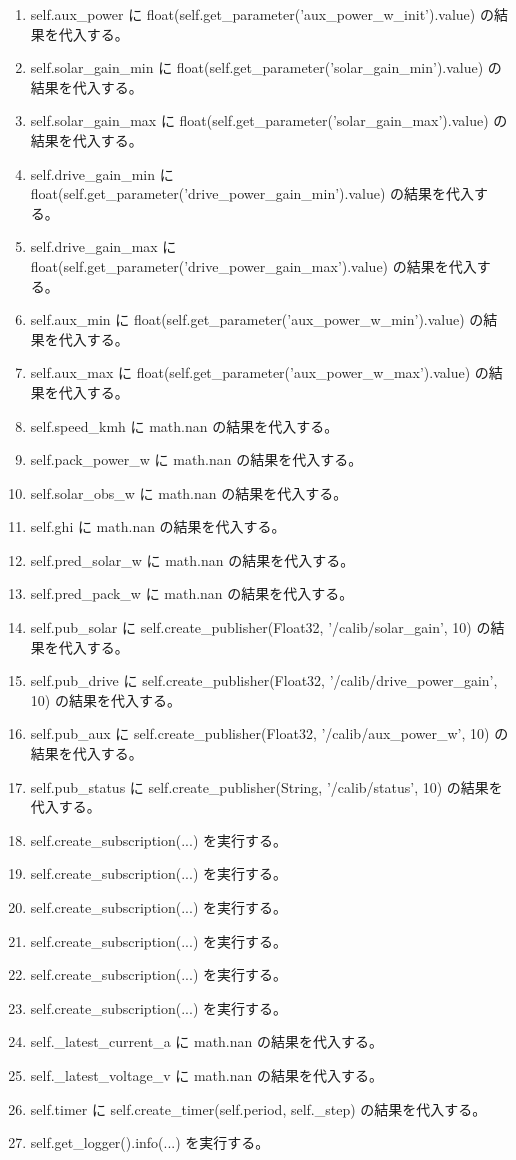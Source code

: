 \documentclass[a4paper,11pt]{article}
\begin{document}
\begin{enumerate}[leftmargin=1.8em]
\item self.aux\_power に float(self.get\_parameter('aux\_power\_w\_init').value) の結果を代入する。
\item self.solar\_gain\_min に float(self.get\_parameter('solar\_gain\_min').value) の結果を代入する。
\item self.solar\_gain\_max に float(self.get\_parameter('solar\_gain\_max').value) の結果を代入する。
\item self.drive\_gain\_min に float(self.get\_parameter('drive\_power\_gain\_min').value) の結果を代入する。
\item self.drive\_gain\_max に float(self.get\_parameter('drive\_power\_gain\_max').value) の結果を代入する。
\item self.aux\_min に float(self.get\_parameter('aux\_power\_w\_min').value) の結果を代入する。
\item self.aux\_max に float(self.get\_parameter('aux\_power\_w\_max').value) の結果を代入する。
\item self.speed\_kmh に math.nan の結果を代入する。
\item self.pack\_power\_w に math.nan の結果を代入する。
\item self.solar\_obs\_w に math.nan の結果を代入する。
\item self.ghi に math.nan の結果を代入する。
\item self.pred\_solar\_w に math.nan の結果を代入する。
\item self.pred\_pack\_w に math.nan の結果を代入する。
\item self.pub\_solar に self.create\_publisher(Float32, '/calib/solar\_gain', 10) の結果を代入する。
\item self.pub\_drive に self.create\_publisher(Float32, '/calib/drive\_power\_gain', 10) の結果を代入する。
\item self.pub\_aux に self.create\_publisher(Float32, '/calib/aux\_power\_w', 10) の結果を代入する。
\item self.pub\_status に self.create\_publisher(String, '/calib/status', 10) の結果を代入する。
\item self.create\_subscription(...) を実行する。
\item self.create\_subscription(...) を実行する。
\item self.create\_subscription(...) を実行する。
\item self.create\_subscription(...) を実行する。
\item self.create\_subscription(...) を実行する。
\item self.create\_subscription(...) を実行する。
\item self.\_latest\_current\_a に math.nan の結果を代入する。
\item self.\_latest\_voltage\_v に math.nan の結果を代入する。
\item self.timer に self.create\_timer(self.period, self.\_step) の結果を代入する。
\item self.get\_logger().info(...) を実行する。
            \end{enumerate}
\end{document}
